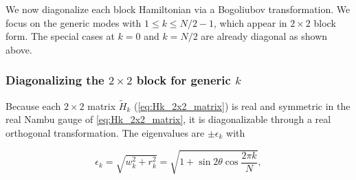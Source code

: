We now diagonalize each block Hamiltonian via a Bogoliubov transformation. We focus on the generic modes with $1 \leq k \leq N/2-1$, which appear in $2\times 2$ block form. The special cases at $k=0$ and $k=N/2$ are already diagonal as shown above.

\subsubsection{Diagonalizing the \texorpdfstring{$2\times 2$}{2 by 2} block for generic \texorpdfstring{$k$}{k}}

Because each $2\times 2$ matrix $\tilde{H}_k$ (\cref{eq:Hk_2x2_matrix}) is
real and symmetric in the real Nambu gauge of \cref{eq:Hk_2x2_matrix}, it is
diagonalizable through a real orthogonal transformation. The eigenvalues are
$\pm \epsilon_k$ with

\begin{equation}
    \epsilon_k = \sqrt{w_k^2 + r_k^2}=\sqrt{1 + \sin2\theta \cos\frac{2\pi k}{N}},
    \label{eq:app:epsilonk}
\end{equation}

